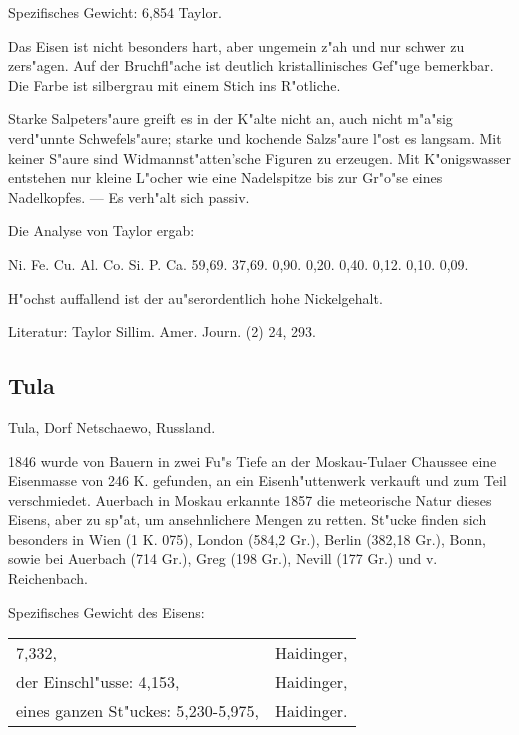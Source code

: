 \documentclass[a4paper, 11pt, oneside]{article}
\begin{document}
Spezifisches Gewicht: 6,854 Taylor.

Das Eisen ist nicht besonders hart, aber ungemein z"ah und nur schwer zu zers"agen. Auf der Bruchfl"ache ist deutlich kristallinisches Gef"uge bemerkbar. Die Farbe ist silbergrau mit einem Stich ins R"otliche.

Starke Salpeters"aure greift es in der K"alte nicht an, auch nicht m"a"sig verd"unnte Schwefels"aure; starke und kochende Salzs"aure l"ost es langsam. Mit keiner S"aure sind Widmannst"atten'sche Figuren zu erzeugen. Mit K"onigswasser entstehen nur kleine L"ocher wie eine Nadelspitze bis zur Gr"o"se eines Nadelkopfes. --- Es verh"alt sich passiv.

Die Analyse von Taylor ergab:

Ni. Fe. Cu. Al. Co. Si. P. Ca.  
59,69. 37,69. 0,90. 0,20. 0,40. 0,12. 0,10. 0,09.

H"ochst auffallend ist der au"serordentlich hohe Nickelgehalt.

Literatur: Taylor Sillim. Amer. Journ. (2) 24, 293.

\subsection{Tula}

Tula, Dorf Netschaewo, Russland.

1846 wurde von Bauern in zwei Fu"s Tiefe an der Moskau-Tulaer Chaussee eine Eisenmasse von 246 K. gefunden, an ein Eisenh"uttenwerk verkauft und zum Teil verschmiedet. Auerbach in Moskau erkannte 1857 die meteorische Natur dieses Eisens, aber zu sp"at, um ansehnlichere Mengen zu retten. St"ucke finden sich besonders in Wien (1 K. 075), London (584,2 Gr.), Berlin (382,18 Gr.), Bonn, sowie bei Auerbach (714 Gr.), Greg (198 Gr.), Nevill (177 Gr.) und v. Reichenbach.

Spezifisches Gewicht des Eisens: 
\begin{table}[!ht]
    \centering
    \begin{tabular}{l l}
        7,332, & Haidinger,\\
        der Einschl"usse: 4,153, & Haidinger,\\
        eines ganzen St"uckes: 5,230-5,975, & Haidinger.
    \end{tabular}
\end{table}
\end{document}
